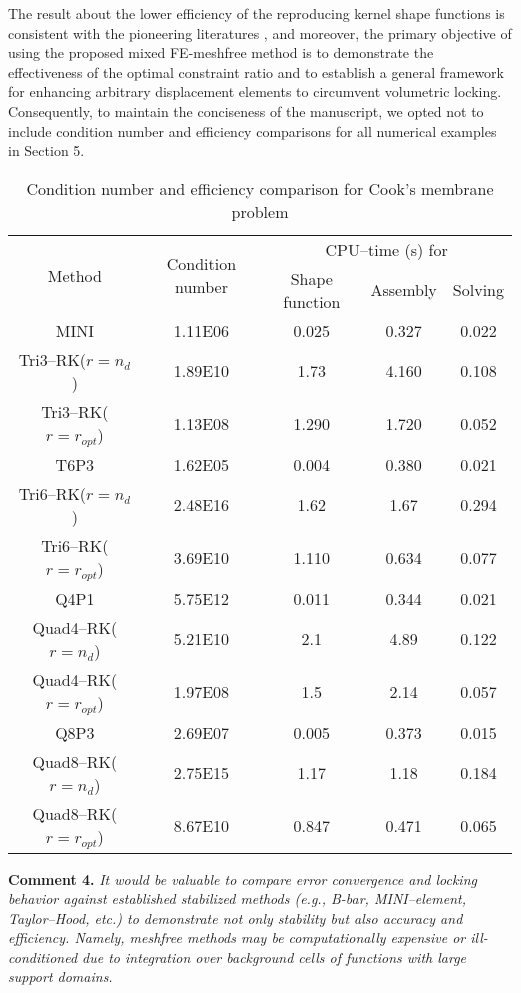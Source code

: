 \documentclass{article}
\begin{document}
The result about the lower efficiency of the reproducing kernel shape functions is consistent with the pioneering literatures \cite{wang2019},
and moreover, the primary objective of using the proposed mixed FE-meshfree method is to demonstrate the effectiveness of the optimal constraint ratio and to establish a general framework for enhancing arbitrary displacement elements to circumvent volumetric locking.
Consequently, to maintain the conciseness of the manuscript, we opted not to include condition number and efficiency comparisons for all numerical examples in Section 5.

\begin{table}[H]
\centering
\caption{Condition number and efficiency comparison for Cook's membrane problem}
\label{tab1}
\begin{tabular}{ccccc}
\toprule
\multirow{2}{*}{Method} & \multirow{2}{*}{Condition number} & \multicolumn{3}{c}{CPU--time (s) for} \\
\shortstack{} & \shortstack{} & Shape function & Assembly & Solving \\
\midrule
MINI & 1.11E06 & 0.025 & 0.327 & 0.022 \\
Tri3--RK($r=n_d$) & 1.89E10 & 1.73 & 4.160 & 0.108 \\
Tri3--RK($r=r_{opt}$) & 1.13E08 & 1.290 & 1.720 & 0.052 \\
T6P3 & 1.62E05 & 0.004 & 0.380 & 0.021 \\
Tri6--RK($r=n_d$) & 2.48E16 & 1.62 & 1.67 & 0.294 \\
Tri6--RK($r=r_{opt}$) & 3.69E10 & 1.110 & 0.634 & 0.077 \\
Q4P1 & 5.75E12 & 0.011 & 0.344 & 0.021 \\
Quad4--RK($r=n_d$) & 5.21E10 & 2.1 & 4.89 & 0.122 \\
Quad4--RK($r=r_{opt}$) & 1.97E08 & 1.5 & 2.14 & 0.057 \\
Q8P3 & 2.69E07 & 0.005 & 0.373 & 0.015 \\
Quad8--RK($r=n_d$) & 2.75E15 & 1.17 & 1.18 & 0.184 \\
Quad8--RK($r=r_{opt}$) & 8.67E10 & 0.847 & 0.471 & 0.065 \\
\bottomrule
\end{tabular}
\end{table}

\textbf{Comment 4.} \textit{
It would be valuable to compare error convergence and locking behavior against established stabilized methods (e.g., B-bar, MINI–element, Taylor–Hood, etc.) to demonstrate not only stability but also accuracy and efficiency. Namely, meshfree methods may be computationally expensive or ill-conditioned due to integration over background cells of functions with large support domains.
}
\end{document}
